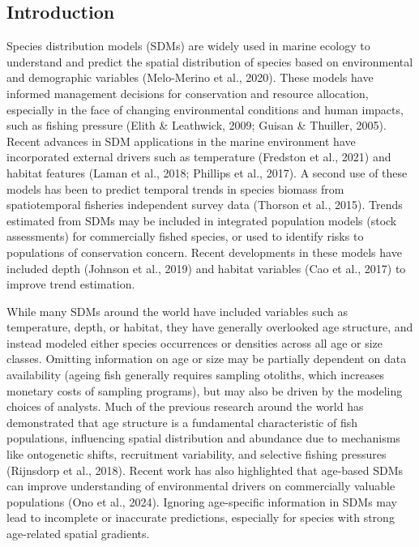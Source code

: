 \documentclass[
]{article}
\begin{document}
\hypertarget{introduction}{%
\subsection{Introduction}\label{introduction}}

Species distribution models (SDMs) are widely used in marine ecology to
understand and predict the spatial distribution of species based on
environmental and demographic variables (Melo-Merino et al., 2020).
These models have informed management decisions for conservation and
resource allocation, especially in the face of changing environmental
conditions and human impacts, such as fishing pressure (Elith \&
Leathwick, 2009; Guisan \& Thuiller, 2005). Recent advances in SDM
applications in the marine environment have incorporated external
drivers such as temperature (Fredston et al., 2021) and habitat features
(Laman et al., 2018; Phillips et al., 2017). A second use of these
models has been to predict temporal trends in species biomass from
spatiotemporal fisheries independent survey data (Thorson et al., 2015).
Trends estimated from SDMs may be included in integrated population
models (stock assessments) for commercially fished species, or used to
identify risks to populations of conservation concern. Recent
developments in these models have included depth (Johnson et al., 2019)
and habitat variables (Cao et al., 2017) to improve trend estimation.

While many SDMs around the world have included variables such as
temperature, depth, or habitat, they have generally overlooked age
structure, and instead modeled either species occurrences or densities
across all age or size classes. Omitting information on age or size may
be partially dependent on data availability (ageing fish generally
requires sampling otoliths, which increases monetary costs of sampling
programs), but may also be driven by the modeling choices of analysts.
Much of the previous research around the world has demonstrated that age
structure is a fundamental characteristic of fish populations,
influencing spatial distribution and abundance due to mechanisms like
ontogenetic shifts, recruitment variability, and selective fishing
pressures (Rijnsdorp et al., 2018). Recent work has also highlighted
that age-based SDMs can improve understanding of environmental drivers
on commercially valuable populations (Ono et al., 2024). Ignoring
age-specific information in SDMs may lead to incomplete or inaccurate
predictions, especially for species with strong age-related spatial
gradients.
\end{document}
